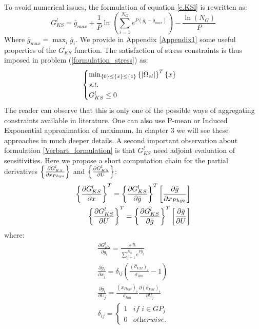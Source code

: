 To avoid numerical issues, the formulation of equation \ref{e.KSl} is rewritten as:
\begin{equation}
\label{eq.2.32}
G^{l}_{KS}=\bar{g}_{max}+\frac{1}{P}\ln\left(\sum_{i=1}^{N_G}e^{P\left(\bar{g}_i-\bar{g}_{max}\right)}\right)-\frac{\ln\left(N_G\right)}{P}
\end{equation}
Where $\bar{g}_{max}=\max_i\bar{g}_i$. We provide in Appendix \ref{Appendix1} some useful properties of the $G_{KS}^l$ function.
The satisfaction of stress constraints is thus imposed in problem (\ref{formulation_stress}) as:
\begin{equation}
\begin{cases}
\label{Verbart_formulation}
\min_{\left\lbrace{0}\right \rbrace\leq\left\lbrace{x}\right \rbrace\leq\left\lbrace{1}\right \rbrace} {\left\lbrace{|\Omega_{el}|}\right \rbrace^T\left\lbrace{x}\right \rbrace} \\
\textit{s.t.}\\
G^{l}_{KS}\leq 0 
\end{cases}
\end{equation}
The reader can observe that this is only one of the possible ways of aggregating constraints available in literature.  One can also use P-mean \cite{duysinx1998new} or Induced Exponential \cite{kennedy2015improved} approximation of maximum. In chapter 3 we will see these approaches in much deeper details.
A second important observation about formulation \ref{Verbart_formulation} is that $G^{l}_{KS}$ need adjoint evaluation of sensitivities. Here we propose a short computation chain for the partial derivatives $\left\lbrace{\frac{\partial G_{KS}^l}{\partial x_{Phys}}}\right \rbrace$ and  $\left\lbrace{\frac{\partial G_{KS}^l}{\partial U}}\right \rbrace$:
\begin{eqnarray}
\left\lbrace{\frac{\partial G_{KS}^l}{\partial x}}\right \rbrace^T=\left\lbrace{\frac{\partial G_{KS}^l}{\partial \bar{g}}}\right \rbrace^T\left[{\frac{\partial  \bar{g}}{\partial x_{Phys}}}\right]\\
\left\lbrace{\frac{\partial G_{KS}^l}{\partial U}}\right \rbrace^T=\left\lbrace{\frac{\partial G_{KS}^l}{\partial \bar{g}}}\right \rbrace^T\left[{\frac{\partial  \bar{g}}{\partial U}}\right]
\end{eqnarray}
where:
\begin{eqnarray}
\frac{\partial G_{KS}^l}{\partial \bar{g}_i}=\frac{e^{P\bar{g}_i}}{\sum_{j=1}^{N_G}e^{P\bar{g}_j}}\\
\frac{\partial  \bar{g}_i}{\partial x_j}=\delta_{ij} \left(\frac{(\hat{\sigma}_{VM})_i}{\sigma_{lim}}-1\right)\\
\frac{\partial  \bar{g}_i}{\partial U_j}=\frac{(x_{Phys})_i}{\sigma_{lim}}\frac{\partial (\hat{\sigma}_{VM})_i} {\partial U_j}\\
\delta_{ij}=\begin{cases}
1 & \textit{if } i\in GP_j \\
0 & \textit{otherwise.}
\end{cases}
\end{eqnarray} 

